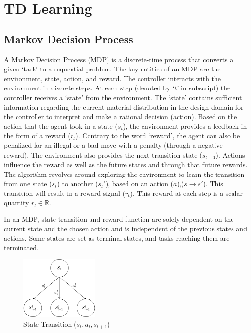 \section{TD Learning}
\subsection{Markov Decision Process}\label{section:MDP_MDP}

A Markov Decision Process (MDP) is a discrete-time process that converts a given `task' to a sequential problem. The key entities of an MDP are the environment, state, action, and reward. The controller interacts with the environment in discrete steps. At each step (denoted by `$t$' in subscript) the controller receives a `state' from the environment. The `state' contains sufficient information regarding the current material distribution in the design domain for the controller to interpret and make a rational decision (action). Based on the action that the agent took in a state ($s_t$), the environment provides a feedback in the form of a reward ($r_t$). Contrary to the word `reward', the agent can also be penalized for an illegal or a bad move with a penalty (through a negative reward). The environment also provides the next transition state ($s_{t+1}$). Actions influence the reward as well as the future states and through that future rewards. The algorithm revolves around exploring the environment to learn the transition from one state ($s_t$) to another ($s_t'$), based on an action ($a$),($s\rightarrow s'$). This transition will result in a reward signal ($r_t$). This reward at each step is a scalar quantity $r_t \in \mathds{R}$.

In an MDP, state transition and reward function are solely dependent on the current state and the chosen action and is independent of the previous states and actions. Some states are set as terminal states, and tasks reaching them are terminated.

\begin{figure}[h!]
    \centering
    \includegraphics[width=0.35\textwidth]{Figures/Ch_MDP/MDP_state_transition.png}
    \caption{State Transition ($s_t, a_t, s_{t+1}$)}
    \label{fig:MDP_state_transition}
\end{figure}

